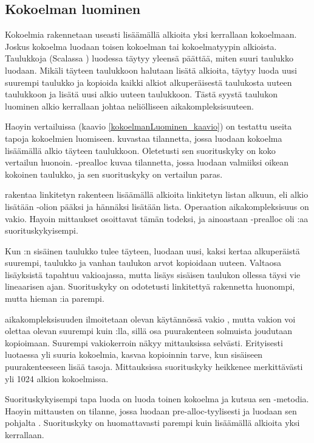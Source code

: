\subsection{Kokoelman luominen}
Kokoelmia rakennetaan useasti lisäämällä alkioita yksi kerrallaan kokoelmaan. Joskus kokoelma luodaan toisen kokoelman tai kokoelmatyypin alkioista. Taulukkoja (Scalassa ) luodessa täytyy yleensä päättää, miten suuri taulukko luodaan. Mikäli täyteen taulukkoon halutaan lisätä alkioita, täytyy luoda uusi suurempi taulukko ja kopioida kaikki alkiot alkuperäisestä taulukosta uuteen taulukkoon ja lisätä uusi alkio uuteen taulukkoon. Tästä syystä taulukon luominen alkio kerrallaan johtaa neliölliseen aikakompleksisuuteen.

Haoyin vertailuissa\cite{haoyiBenchmark} (kaavio \ref{kokoelmanLuominen_kaavio}) on testattu useita tapoja kokoelmien luomiseen.  kuvastaa tilannetta, jossa luodaan kokoelma lisäämällä alkio täyteen taulukkoon. Oletetusti sen suorituskyky on koko vertailun huonoin. -prealloc kuvaa tilannetta, jossa luodaan valmiiksi oikean kokoinen taulukko, ja sen suorituskyky on vertailun paras.

 rakentaa linkitetyn rakenteen lisäämällä alkioita linkitetyn listan alkuun, eli alkio lisätään \code{::}-olion pääksi ja hännäksi lisätään lista. Operaation aikakompleksisuus on vakio. \cite{scalaCollections} Hayoin mittaukset osoittavat tämän todeksi, ja ainoastaan -prealloc oli :aa suorituskykyisempi.

Kun :n sisäinen taulukko tulee täyteen, luodaan uusi, kaksi kertaa alkuperäistä suurempi, taulukko ja vanhan taulukon arvot kopioidaan uuteen. Valtaosa lisäyksistä tapahtuu vakioajassa, mutta lisäys sisäisen taulukon ollessa täysi vie lineaarisen ajan. Suorituskyky on odotetusti linkitettyä rakennetta huonompi, mutta hieman :ia parempi.

 aikakompleksisuuden ilmoitetaan olevan käytännössä vakio \cite{scalaCollections}, mutta vakion voi olettaa olevan suurempi kuin :lla, sillä osa puurakenteen solmuista joudutaan kopioimaan.  Suurempi vakiokerroin näkyy mittauksissa selvästi. Erityisesti luotaessa yli suuria kokoelmia, kasvaa kopioinnin tarve, kun sisäiseen puurakenteeseen lisää tasoja. Mittauksissa suorituskyky heikkenee merkittävästi yli 1024 alkion kokoelmissa.

Suorituskykyisempi tapa luoda  on luoda toinen kokoelma ja kutsua sen -metodia. Haoyin\cite{haoyiBenchmark} mittausten  on tilanne, jossa luodaan  pre-alloc-tyylisesti ja luodaan sen pohjalta . Suorituskyky on huomattavasti parempi kuin lisäämällä alkioita yksi kerrallaan.

